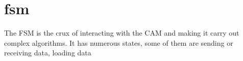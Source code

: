 \section{fsm}
The FSM is the crux of interacting with the CAM and making it carry out complex algorithms. 
It has numerous states, some of them are sending or receiving data, loading data